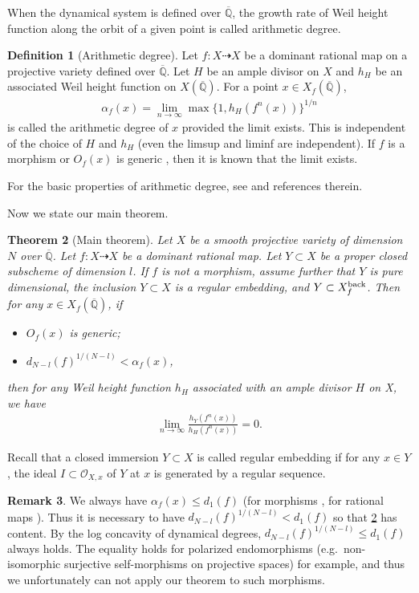 \documentclass[12pt]{amsart}
\theoremstyle{plain}
\newtheorem{theorem}{Theorem}[section]
\theoremstyle{definition}
\newtheorem{definition}[theorem]{Definition}
\newtheorem{remark}[theorem]{Remark}
\numberwithin{equation}{section}
\def\QQ{\overline{\mathbb Q}}
\def\O{{ \mathcal{O}}}
\begin{document}
When the dynamical system is defined over $\QQ$,
the growth rate of Weil height function along the orbit of a given point
is called arithmetic degree. 
\begin{definition}[Arithmetic degree]
Let $f \colon X \dashrightarrow X$ be a dominant rational map on a projective variety 
defined over $\QQ$.
Let $H$ be an ample divisor on $X$ and $h_{H}$ be an associated Weil height function on $X(\QQ)$.
For a point $x \in X_{f}(\QQ)$, 
\begin{align}
\alpha_{f}(x) = \lim_{n \to \infty} \max\{1, h_{H}(f^{n}(x)) \}^{1/n}
\end{align}
is called the arithmetic degree of $x$ provided the limit exists.
This is independent of the choice of $H$ and $h_{H}$ (even the limsup and liminf are independent).
If $f$ is a morphism \cite{KS16a} or $O_{f}(x)$ is generic \cite{matsuzawa-note-ad-dls}, then it is known that the limit exists. 
\end{definition}
For the basic properties of arithmetic degree, see \cite{matsuzawa2023recent}
and references therein.


Now we state our main theorem.

\begin{theorem}[Main theorem]\label{thm:gcdgrowth}
Let $X$ be a smooth projective variety of dimension $N$ over $\QQ$.
Let $f \colon X \dashrightarrow X$ be a dominant rational map.
Let $Y \subset X$ be a proper closed subscheme of dimension $l$.
If $f$ is not a morphism, assume further that $Y$ is pure dimensional,
the inclusion $Y \subset X$ is a regular embedding, and $Y \subset X_{f}^{\rm back}$.
Then for any $x \in X_{f}(\QQ)$, if
\begin{itemize}
\item
$O_{f}(x)$ is generic;
\item
$d_{N-l}(f)^{1/(N-l)} < \alpha_{f}(x)$,
\end{itemize}
then for any Weil height function $h_{H}$ associated with an ample divisor $H$ on X, we have
\begin{align}
\lim_{n \to \infty}\frac{h_{Y}(f^{n}(x))}{h_{H}(f^{n}(x))} = 0.
\end{align}
\end{theorem}
Recall that a closed immersion $Y \subset X$ is called regular embedding
if for any $x \in Y$, the ideal $I \subset \O_{X,x}$ of $Y$ at $x$ is generated by
a regular sequence.

\begin{remark}
We always have $ \alpha_{f}(x) \leq d_{1}(f)$ (for morphisms \cite{KS16a}, for rational maps \cite{Ma20a}).
Thus it is necessary to have $d_{N-l}(f)^{1/(N-l)} < d_{1}(f)$ so that 
\cref{thm:gcdgrowth} has content.
By the log concavity of dynamical degrees, $d_{N-l}(f)^{1/(N-l)} \leq d_{1}(f)$ always holds.
The equality holds for polarized endomorphisms 
(e.g.\ non-isomorphic surjective self-morphisms on projective spaces) for example, 
and thus we unfortunately can not apply our theorem to such morphisms.
\end{remark}
\end{document}
